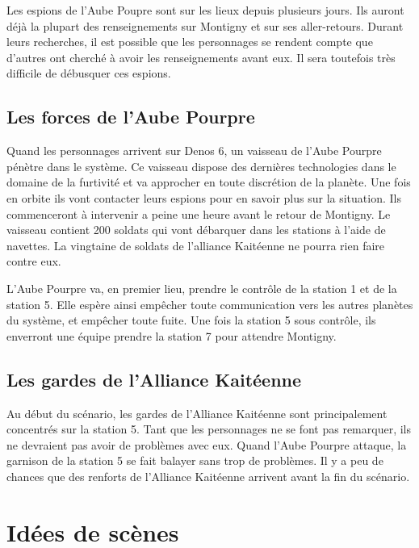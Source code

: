 \begin{multicols}{2}
Les espions de l'Aube Poupre sont sur les lieux depuis plusieurs jours. Ils auront déjà la plupart des renseignements sur Montigny et sur ses aller-retours. Durant leurs recherches, il est possible que les personnages se rendent compte que d'autres ont cherché à avoir les renseignements avant eux. Il sera toutefois très difficile de débusquer ces espions.

\section{Les forces de l'Aube Pourpre}

Quand les personnages arrivent sur Denos 6, un vaisseau de l'Aube Pourpre pénètre dans le système. Ce vaisseau dispose des dernières technologies dans le domaine de la furtivité et va approcher en toute discrétion de la planète. Une fois en orbite ils vont contacter leurs espions pour en savoir plus sur la situation. Ils commenceront à intervenir a peine une heure avant le retour de Montigny. Le vaisseau contient 200 soldats qui vont débarquer dans les stations à l'aide de navettes. La vingtaine de soldats de l'alliance Kaitéenne ne pourra rien faire contre eux. 

L'Aube Pourpre va, en premier lieu, prendre le contrôle de la station 1 et de la station 5. Elle espère ainsi empêcher toute communication vers les autres planètes du système, et empêcher toute fuite. Une fois la station 5 sous contrôle, ils enverront une équipe prendre la station 7 pour attendre Montigny.

\section{Les gardes de l'Alliance Kaitéenne}

Au début du scénario, les gardes de l'Alliance Kaitéenne sont principalement concentrés sur la station 5. Tant que les personnages ne se font pas remarquer, ils ne devraient pas avoir de problèmes avec eux. Quand l'Aube Pourpre attaque, la garnison de la station 5 se fait balayer sans trop de problèmes. Il y a peu de chances que des renforts de l'Alliance Kaitéenne arrivent avant la fin du scénario.

\end{multicols}

\chapter{Idées de scènes}

